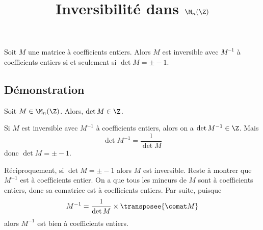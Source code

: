 \documentclass[fontsize=12pt,twoside=false,parskip=half, french]{scrartcl}
\title{Inversibilité dans $\M_n(\Z)$}
\date{}
\author{}
\begin{document}
\maketitle
   \begin{Theoreme}
      Soit $M$ une matrice à coefficients entiers. Alors $M$ est inversible 
      avec $M^{-1}$ à coefficients entiers si et seulement si $\det M = \pm -1$.
   \end{Theoreme}
   \subsection{Démonstration}
       Soit $M \in \M_n(\Z)$. Alors, $\det M \in \Z$.
       
       Si $M$ est inversible avec $M^{-1}$ à coefficients entiers, alors on a
       $\det M^{-1} \in \Z$. Mais
       \[
           \det M^{-1} = \frac{1}{\det M}
       \]
       donc $\det M = \pm -1$.
       
       Réciproquement, si $\det M = \pm -1$ alors $M$ est inversible. Reste à 
       montrer que $M^{-1}$ est à coefficients entier. On a que tous les mineurs
       de $M$ sont à coefficients entiers, donc sa comatrice est à coefficients
       entiers. Par suite, puisque
       \[
           M^{-1} = \frac{1}{\det M} \times \transposee{\comat M}
       \]
       alors $M^{-1}$ est bien à coefficients entiers.
\end{document}
